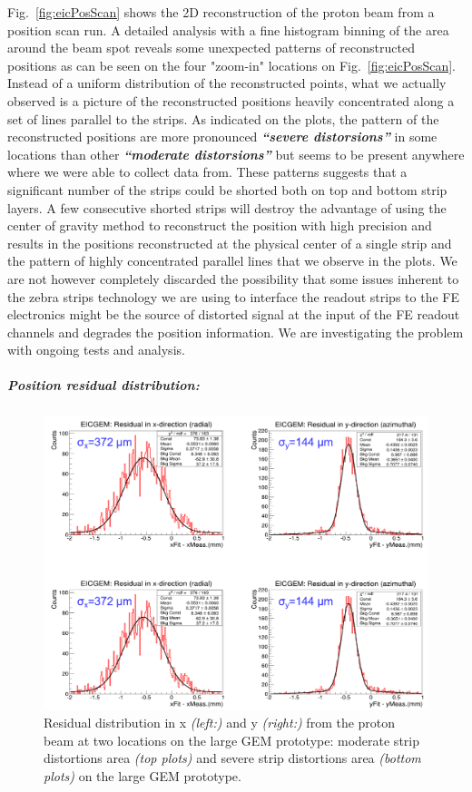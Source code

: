 %
Fig.~\ref{fig:eicPosScan} shows the 2D reconstruction of the proton beam from a position scan run. A detailed analysis with a fine histogram binning of the area around the beam spot reveals some unexpected patterns of reconstructed positions as can be seen on the four "zoom-in" locations on Fig.~\ref{fig:eicPosScan}. Instead of a uniform distribution of the reconstructed points, what we actually observed  is a picture of  the reconstructed positions heavily concentrated along a set of lines parallel to the strips. As indicated on the plots, the pattern of the reconstructed positions are more pronounced \textit{\textbf{``severe distorsions''}} in some locations than other \textit{\textbf{``moderate distorsions''}} but seems to be present anywhere where we were able to collect data from. These patterns suggests that a significant number of the strips could be shorted both on top and bottom strip layers. A few consecutive shorted strips will destroy the advantage of using  the center of gravity method  to reconstruct the position with high precision and results in the positions reconstructed at the physical center of a single strip and the pattern of highly concentrated parallel lines that we observe in the plots. We are not however completely discarded the possibility that some issues inherent to the zebra strips technology we are using to interface the readout strips to the FE electronics might be the source of distorted signal at the input of the FE readout channels and degrades the position information. We are investigating the  problem with ongoing tests and analysis.
%
\subparagraph*{\textbf Position residual distribution:}
%
\begin{figure}[htb]
\centering
\includegraphics[width=1\columnwidth,trim={0pt 0mm 0pt 0mm},clip]{UVa_plots/eicResidual}
\caption{\label{fig:eicResidual} Residual distribution in x {\it(left:)} and y {\it (right:)} from the proton beam at two locations on the large GEM prototype:  moderate strip distortions area {\it (top plots)} and  severe strip distortions area {\it (bottom plots)} on the large GEM prototype.}
\end{figure}
%
